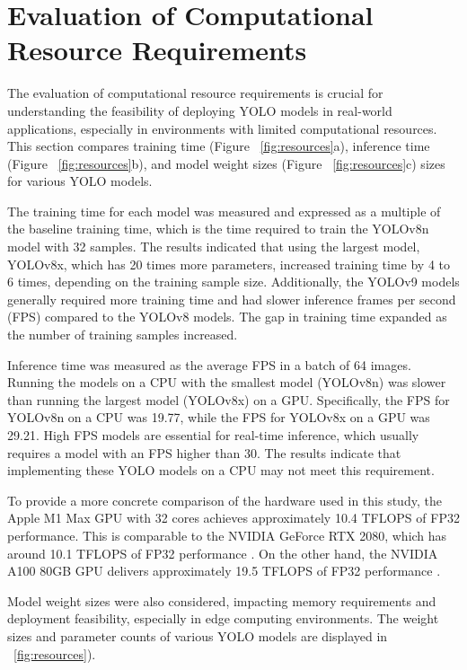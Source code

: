 \section{Evaluation of Computational Resource Requirements}

The evaluation of computational resource requirements is crucial for understanding the feasibility of deploying YOLO models in real-world applications, especially in environments with limited computational resources. This section compares training time (Figure ~\ref{fig:resources}a), inference time (Figure ~\ref{fig:resources}b), and model weight sizes (Figure ~\ref{fig:resources}c) sizes for various YOLO models.

The training time for each model was measured and expressed as a multiple of the baseline training time, which is the time required to train the YOLOv8n model with 32 samples. The results indicated that using the largest model, YOLOv8x, which has 20 times more parameters, increased training time by 4 to 6 times, depending on the training sample size. Additionally, the YOLOv9 models generally required more training time and had slower inference frames per second (FPS) compared to the YOLOv8 models. The gap in training time expanded as the number of training samples increased.

Inference time was measured as the average FPS in a batch of 64 images. Running the models on a CPU with the smallest model (YOLOv8n) was slower than running the largest model (YOLOv8x) on a GPU. Specifically, the FPS for YOLOv8n on a CPU was 19.77, while the FPS for YOLOv8x on a GPU was 29.21. High FPS models are essential for real-time inference, which usually requires a model with an FPS higher than 30. The results indicate that implementing these YOLO models on a CPU may not meet this requirement.

To provide a more concrete comparison of the hardware used in this study, the Apple M1 Max GPU with 32 cores achieves approximately 10.4 TFLOPS of FP32 performance. This is comparable to the NVIDIA GeForce RTX 2080, which has around 10.1 TFLOPS of FP32 performance \cite{notebookcheck_m1_max}. On the other hand, the NVIDIA A100 80GB GPU delivers approximately 19.5 TFLOPS of FP32 performance \cite{nvidia_a100}.

Model weight sizes were also considered, impacting memory requirements and deployment feasibility, especially in edge computing environments. The weight sizes and parameter counts of various YOLO models are displayed in ~\ref{fig:resources}).

